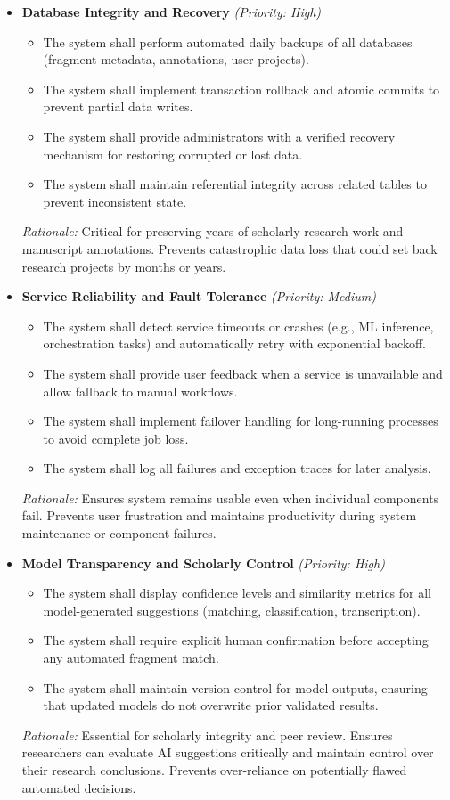 \documentclass{article}
\begin{document}
\begin{itemize}
    \item \textbf{Database Integrity and Recovery} \textit{(Priority: High)}
    \begin{itemize}
        \item The system shall perform automated daily backups of all databases (fragment metadata, annotations, user projects).
        \item The system shall implement transaction rollback and atomic commits to prevent partial data writes.
        \item The system shall provide administrators with a verified recovery mechanism for restoring corrupted or lost data.
        \item The system shall maintain referential integrity across related tables to prevent inconsistent state.
    \end{itemize}
    \textit{Rationale:} Critical for preserving years of scholarly research work and manuscript annotations. Prevents catastrophic data loss that could set back research projects by months or years.

    \item \textbf{Service Reliability and Fault Tolerance} \textit{(Priority: Medium)}
    \begin{itemize}
        \item The system shall detect service timeouts or crashes (e.g., ML inference, orchestration tasks) and automatically retry with exponential backoff.
        \item The system shall provide user feedback when a service is unavailable and allow fallback to manual workflows.
        \item The system shall implement failover handling for long-running processes to avoid complete job loss.
        \item The system shall log all failures and exception traces for later analysis.
    \end{itemize}
    \textit{Rationale:} Ensures system remains usable even when individual components fail. Prevents user frustration and maintains productivity during system maintenance or component failures.

    \item \textbf{Model Transparency and Scholarly Control} \textit{(Priority: High)}
    \begin{itemize}
        \item The system shall display confidence levels and similarity metrics for all model-generated suggestions (matching, classification, transcription).
        \item The system shall require explicit human confirmation before accepting any automated fragment match.
        \item The system shall maintain version control for model outputs, ensuring that updated models do not overwrite prior validated results.
    \end{itemize}
    \textit{Rationale:} Essential for scholarly integrity and peer review. Ensures researchers can evaluate AI suggestions critically and maintain control over their research conclusions. Prevents over-reliance on potentially flawed automated decisions.


\end{itemize}
\end{document}
